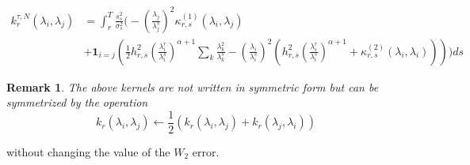 \documentclass[11pt]{article}
\newtheorem{remark}{Remark}
\begin{document}
\begin{repeatcor2}
\begin{align*}
\\
 k_r^{\tau, N} (\lambda_i, \lambda_j) &= \int_r^T \frac{s_s^2}{\sigma_s^2}\Biggl(
- \left( \frac{\lambda_j}{\lambda^s_j}\right)^2  \kappa^{(1)}_{r,s}(\lambda_i, \lambda_j)   \\ &+ \mathbf{1}_{i=j} \left(\frac{1}{2} h_{r,s}^2 \left(\frac{\lambda_i^{r}}{\lambda_i^{s}}\right)^{\alpha+1} \sum_k \frac{\lambda_k^2}{\lambda^s_k} - \left( \frac{\lambda_i}{\lambda^s_i}\right)^2\left( h_{r,s}^2 \left(\frac{\lambda_i^{r}}{\lambda_i^{s}}\right)^{\alpha+1}  + \kappa^{(2)}_{r,s}(\lambda_i, \lambda_i)\right) \right) \Biggr)ds \nonumber
\end{align*}
\end{repeatcor2}
\begin{remark}
The above kernels are not written in symmetric form but can be symmetrized by the operation $$k_{r} (\lambda_i, \lambda_j)  \gets \frac{1}{2} \left(k_{r} (\lambda_i, \lambda_j)  + k_{r} (\lambda_j, \lambda_i)\right)$$
\end{remark}
without changing the value of the $W_2$ error.
\end{document}
